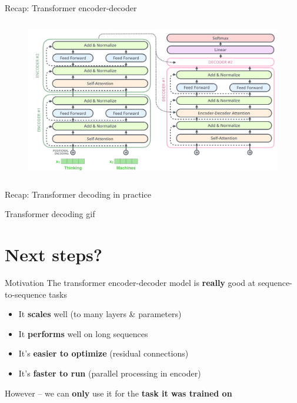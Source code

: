 \documentclass[12pt,aspectratio=169,handout]{beamer}
\begin{document}
\begin{frame}{Recap: Transformer encoder-decoder}
	\begin{center}
		\begin{figure}[h]
			\includegraphics[height=7cm]{transformer_encoder_decoder_stack_full}
		\end{figure}
	\end{center}
\end{frame}

\begin{frame}{Recap: Transformer decoding in practice}
	\begin{center}
		\huge{Transformer decoding gif}
	\end{center}
\end{frame}




\section{Next steps?}

\begin{frame}{Motivation}
	The transformer encoder-decoder model is \textbf{really} good at sequence-to-sequence tasks
	\pause
	\begin{itemize}
		\item It \textbf{scales} well (to many layers \& parameters)
		\pause
		\item It \textbf{performs} well on long sequences
		\pause
		\item It's \textbf{easier to optimize} (residual connections)
		\pause
		\item It's \textbf{faster to run} (parallel processing in encoder)
	\end{itemize}
	\pause
	\vspace{1em}
	However -- we can \textbf{only} use it for the \textbf{task it was trained on}
\end{frame}
\end{document}
